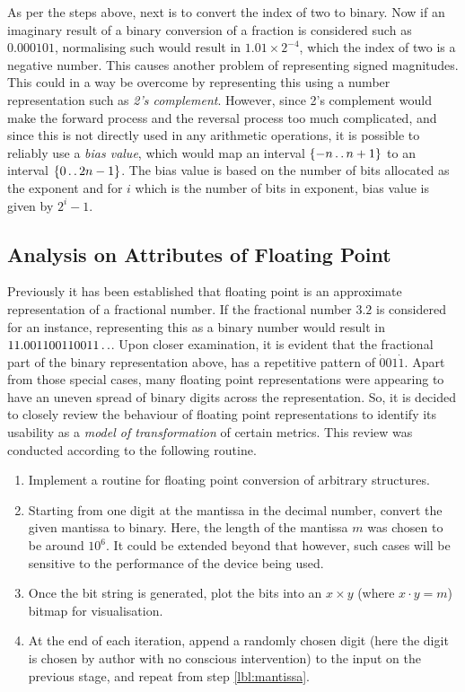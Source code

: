 As per the steps above, next is to convert the index of two to binary. Now if an imaginary result of a binary conversion of a fraction is considered such as $0.000101$, normalising such would result in $1.01 \times 2^{-4}$, which the index of two is a negative number. This causes another problem of representing signed magnitudes. This could in a way be overcome by representing this using a number representation such as \textit{2's complement}. However, since 2's complement would make the forward process and the reversal process too much complicated, and since this is not directly used in any arithmetic operations, it is possible to reliably use a \textit{bias value}, which would map an interval $\{-n \mathinner {\ldotp \ldotp} n+1\}$ to an interval $\{0 \mathinner {\ldotp \ldotp} 2n-1\}$. The bias value is based on the number of bits allocated as the exponent and for $i$ which is the number of bits in exponent, bias value is given by $2^i-1$.

\subsection{Analysis on Attributes of Floating Point}\label{subsec:float_attr}

Previously it has been established that floating point is an approximate representation of a fractional number. If the fractional number $3.2$ is considered for an instance, representing this as a binary number would result in $11.001100110011\mathinner {\ldotp \ldotp}$. Upon closer examination, it is evident that the fractional part of the binary representation above, has a repetitive pattern of $\dot{0}01\dot{1}$. Apart from those special cases, many floating point representations were appearing to have an uneven spread of binary digits across the representation. So, it is decided to closely review the behaviour of floating point representations to identify its usability as a \textit{model of transformation} of certain metrics. This review was conducted according to the following routine.

\begin{enumerate}
    \item Implement a routine for floating point conversion of arbitrary structures.
    
    \item \label{lbl:mantissa} Starting from one digit at the mantissa in the decimal number, convert the given mantissa to binary. Here, the length of the mantissa $m$ was chosen to be around $10^6$. It could be extended beyond that however, such cases will be sensitive to the performance of the device being used.
    
    \item Once the bit string is generated, plot the bits into an $x \times y$ (where $x\cdot y=m$) bitmap for visualisation.
    
    \item At the end of each iteration, append a randomly chosen digit (here the digit is chosen by author with no conscious intervention) to the input on the previous stage, and repeat from step \ref{lbl:mantissa}.
\end{enumerate}

